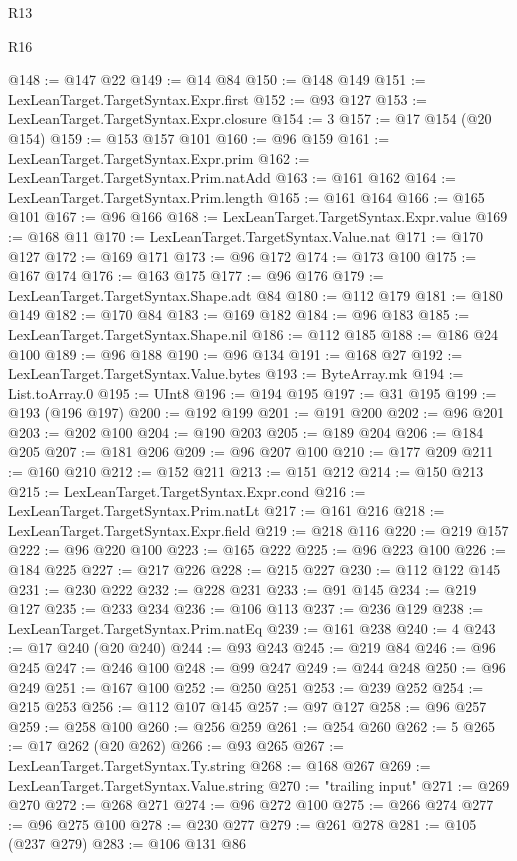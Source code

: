 \begin{lexlean}{R13}
\begin{lexlean}{R16}
\begin{coremodule}
{{{{{{{{{{{{{{{{{{{{{{{{{{{{{{{{{{{{{{{{{{{{{{{{{{{{{{{{{{{{{{{{{{{{{{{{{{{{{{{{{{{{{{{{{{{{{{{{{{{{{{{{{{{{{{{{{@148 := @147 @22
@149 := @14 @84
@150 := @148 @149
@151 := LexLeanTarget.TargetSyntax.Expr.first
@152 := @93 @127
@153 := LexLeanTarget.TargetSyntax.Expr.closure
@154 := 3
@157 := @17 @154 (@20 @154)
@159 := @153 @157 @101
@160 := @96 @159
@161 := LexLeanTarget.TargetSyntax.Expr.prim
@162 := LexLeanTarget.TargetSyntax.Prim.natAdd
@163 := @161 @162
@164 := LexLeanTarget.TargetSyntax.Prim.length
@165 := @161 @164
@166 := @165 @101
@167 := @96 @166
@168 := LexLeanTarget.TargetSyntax.Expr.value
@169 := @168 @11
@170 := LexLeanTarget.TargetSyntax.Value.nat
@171 := @170 @127
@172 := @169 @171
@173 := @96 @172
@174 := @173 @100
@175 := @167 @174
@176 := @163 @175
@177 := @96 @176
@179 := LexLeanTarget.TargetSyntax.Shape.adt @84
@180 := @112 @179
@181 := @180 @149
@182 := @170 @84
@183 := @169 @182
@184 := @96 @183
@185 := LexLeanTarget.TargetSyntax.Shape.nil
@186 := @112 @185
@188 := @186 @24 @100
@189 := @96 @188
@190 := @96 @134
@191 := @168 @27
@192 := LexLeanTarget.TargetSyntax.Value.bytes
@193 := ByteArray.mk
@194 := List.toArray.{0}
@195 := UInt8
@196 := @194 @195
@197 := @31 @195
@199 := @193 (@196 @197)
@200 := @192 @199
@201 := @191 @200
@202 := @96 @201
@203 := @202 @100
@204 := @190 @203
@205 := @189 @204
@206 := @184 @205
@207 := @181 @206
@209 := @96 @207 @100
@210 := @177 @209
@211 := @160 @210
@212 := @152 @211
@213 := @151 @212
@214 := @150 @213
@215 := LexLeanTarget.TargetSyntax.Expr.cond
@216 := LexLeanTarget.TargetSyntax.Prim.natLt
@217 := @161 @216
@218 := LexLeanTarget.TargetSyntax.Expr.field
@219 := @218 @116
@220 := @219 @157
@222 := @96 @220 @100
@223 := @165 @222
@225 := @96 @223 @100
@226 := @184 @225
@227 := @217 @226
@228 := @215 @227
@230 := @112 @122 @145
@231 := @230 @222
@232 := @228 @231
@233 := @91 @145
@234 := @219 @127
@235 := @233 @234
@236 := @106 @113
@237 := @236 @129
@238 := LexLeanTarget.TargetSyntax.Prim.natEq
@239 := @161 @238
@240 := 4
@243 := @17 @240 (@20 @240)
@244 := @93 @243
@245 := @219 @84
@246 := @96 @245
@247 := @246 @100
@248 := @99 @247
@249 := @244 @248
@250 := @96 @249
@251 := @167 @100
@252 := @250 @251
@253 := @239 @252
@254 := @215 @253
@256 := @112 @107 @145
@257 := @97 @127
@258 := @96 @257
@259 := @258 @100
@260 := @256 @259
@261 := @254 @260
@262 := 5
@265 := @17 @262 (@20 @262)
@266 := @93 @265
@267 := LexLeanTarget.TargetSyntax.Ty.string
@268 := @168 @267
@269 := LexLeanTarget.TargetSyntax.Value.string
@270 := "trailing input"
@271 := @269 @270
@272 := @268 @271
@274 := @96 @272 @100
@275 := @266 @274
@277 := @96 @275 @100
@278 := @230 @277
@279 := @261 @278
@281 := @105 (@237 @279)
@283 := @106 @131 @86
}}}}}}}}}}}}}}}}}}}}}}}}}}}}}}}}}}}}}}}}}}}}}}}}}}}}}}}}}}}}}}}}}}}}}}}}}}}}}}}}}}}}}}}}}}}}}}}}}}}}}}}}}}}}}}}}}
\end{coremodule}
\end{lexlean}
\end{lexlean}

